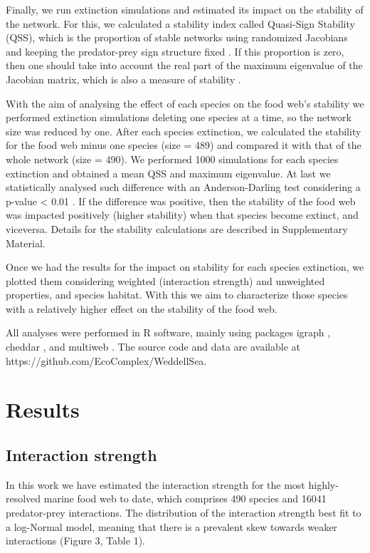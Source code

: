 \documentclass[gc, manuscript]{copernicus}
\begin{document}
Finally, we run extinction simulations and estimated its impact on the
stability of the network. For this, we calculated a stability index
called Quasi-Sign Stability (QSS), which is the proportion of stable
networks using randomized Jacobians and keeping the predator-prey sign
structure fixed \citep{Allesina2008}. If this proportion is zero, then
one should take into account the real part of the maximum eigenvalue of
the Jacobian matrix, which is also a measure of stability
\citep{Grilli2016}.

With the aim of analysing the effect of each species on the food web's
stability we performed extinction simulations deleting one species at a
time, so the network size was reduced by one. After each species
extinction, we calculated the stability for the food web minus one
species (size = 489) and compared it with that of the whole network
(size = 490). We performed 1000 simulations for each species extinction
and obtained a mean QSS and maximum eigenvalue. At last we statistically
analysed such difference with an Anderson-Darling test considering a
p-value \textless{} 0.01 \citep{Scholz1987}. If the difference was
positive, then the stability of the food web was impacted positively
(higher stability) when that species become extinct, and viceversa.
Details for the stability calculations are described in Supplementary
Material.

Once we had the results for the impact on stability for each species
extinction, we plotted them considering weighted (interaction strength)
and unweighted properties, and species habitat. With this we aim to
characterize those species with a relatively higher effect on the
stability of the food web.

All analyses were performed in R software, mainly using packages igraph
\citep{Csardi2005}, cheddar \citep{Hudson2013}, and multiweb
\citep{Saravia2019}. The source code and data are available at
https://github.com/EcoComplex/WeddellSea.

\section{Results}

\subsection{Interaction strength}

In this work we have estimated the interaction strength for the most
highly-resolved marine food web to date, which comprises 490 species and
16041 predator-prey interactions. The distribution of the interaction
strength best fit to a log-Normal model, meaning that there is a
prevalent skew towards weaker interactions (Figure 3, Table 1).
\end{document}
